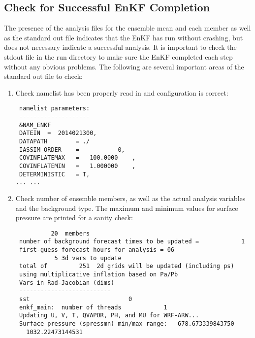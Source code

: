 \subsection{Check for Successful EnKF Completion}

The presence of the analysis files for the ensemble mean and each member as well as the standard out file indicates that the EnKF has run without crashing, but does not necessary indicate a successful analysis. It is important to check the stdout file in the run directory to make sure the EnKF completed each step without any obvious problems. The following are several important areas of the standard out file to check:

\begin{enumerate}
\item Check namelist has been properly read in and configuration is correct:

\begin{footnotesize}
\begin{verbatim}
 namelist parameters:
 --------------------
 &NAM_ENKF
 DATEIN  =  2014021300,
 DATAPATH        = ./                                                                                       
 IASSIM_ORDER    =           0,
 COVINFLATEMAX   =   100.0000    ,
 COVINFLATEMIN   =   1.000000    ,
 DETERMINISTIC   = T,
... ...
\end{verbatim}
\end{footnotesize}

\item Check number of ensemble members, as well as the actual analysis variables and the background type. The maximum and minimum values for surface pressure are printed for a sanity check:

\begin{footnotesize}
\begin{verbatim}
          20  members
 number of background forecast times to be updated =            1
 first-guess forecast hours for analysis = 06
           5 3d vars to update
 total of         251  2d grids will be updated (including ps)
 using multiplicative inflation based on Pa/Pb
 Vars in Rad-Jacobian (dims)
 --------------------------
 sst                            0
 enkf_main:  number of threads            1
 Updating U, V, T, QVAPOR, PH, and MU for WRF-ARW...
 Surface pressure (spressmn) min/max range:   678.673339843750
   1032.22473144531
\end{verbatim}
\end{footnotesize}


\end{enumerate}
